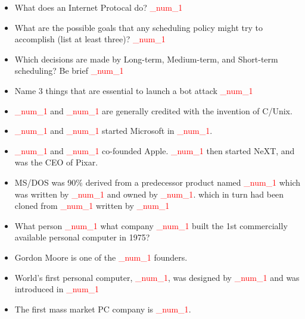 \documentclass[9pt,landscape]{memoir}
\newcommand{\answer}[1]{\textcolor{red}{_num_1}}
\begin{document}
\begin{multicols}{6}
\begin{itemize}
    \item What does an Internet Protocal do?  \answer{1. Provides a naming scheme which uses a uniform format for host addresses 2. Provides a delivery mechanism by defining a standard packet format}
    \item What are the possible goals that any scheduling policy might try to accomplish (list at least three)?  \answer{To improve response time, Turnaround time (TAT), Throughput, Processor Efficieny}
    \item Which decisions are made by Long-term, Medium-term, and Short-term scheduling? Be brief \answer{Long-term scheduling determines which programs are admitted to the system for processing and controls the degree of multiprogramming. Medium-term scheduling determines which programs will be resident. Part of the swapping function. Swapping-in decision is based on the need to manage the degree of multiprogramming Short-term scheduling determines which program will be executed on CPU next. Known as the dispatcher Executes most frequently}
    \item Name 3 things that are essential to launch a bot attack \answer{1) attack software 2) a large number of vulnerable machines 3) locating these machines (scanning or fingerprinting)}
    \item \answer{Dennis Richie} and \answer{Ken Thompson} are generally credited with the invention of C/Unix.
    \item \answer{Bill Gates} and \answer{Paul Allen} started Microsoft in \answer{1975}.
    \item \answer{Steve Jobs} and \answer{Steve Wozniac} co-founded Apple. \answer{Steve Jobs} then started NeXT, and was the CEO of Pixar.
    \item MS/DOS was 90\% derived from a predecessor product named \answer{QDOS} which was written by \answer{Tim Patterson} and owned by \answer{CL Computer Products}. which in turn had been cloned from \answer{CPM} written by \answer{Gary Kildall}
    \item What person \answer{Ed Roberts} what company \answer{MITS} built the 1st commercially available personal computer in 1975?
    \item Gordon Moore is one of the \answer{Intel} founders.
    \item World's first personal computer, \answer{Altair 8800}, was designed by \answer{Ed Roberts} and was introduced in \answer{1975}
    \item The first mass market PC company is \answer{Apple}.

\end{itemize}
\end{multicols}
\end{document}
